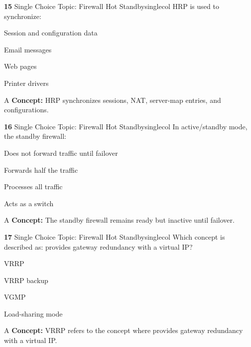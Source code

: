 \documentclass[10pt,a4paper]{article}
\begin{document}
\begin{qcard}{\color{white}\textbf{15} \hfill \small Single Choice \textbar{} Topic: Firewall Hot Standby}{singlecol}
HRP is used to synchronize:

\begin{qoptions}
\item Session and configuration data
\item Email messages
\item Web pages
\item Printer drivers
\end{qoptions}
\begin{explainbox}{A}
\textbf{Concept:} HRP synchronizes sessions, NAT, server-map entries, and configurations.
\end{explainbox}
\end{qcard}

\begin{qcard}{\color{white}\textbf{16} \hfill \small Single Choice \textbar{} Topic: Firewall Hot Standby}{singlecol}
In active/standby mode, the standby firewall:

\begin{qoptions}
\item Does not forward traffic until failover
\item Forwards half the traffic
\item Processes all traffic
\item Acts as a switch
\end{qoptions}
\begin{explainbox}{A}
\textbf{Concept:} The standby firewall remains ready but inactive until failover.
\end{explainbox}
\end{qcard}

\begin{qcard}{\color{white}\textbf{17} \hfill \small Single Choice \textbar{} Topic: Firewall Hot Standby}{singlecol}
Which concept is described as: provides gateway redundancy with a virtual IP?

\begin{qoptions}
\item VRRP
\item VRRP backup
\item VGMP
\item Load-sharing mode
\end{qoptions}
\begin{explainbox}{A}
\textbf{Concept:} VRRP refers to the concept where provides gateway redundancy with a virtual IP.
\end{explainbox}
\end{qcard}
\end{document}

